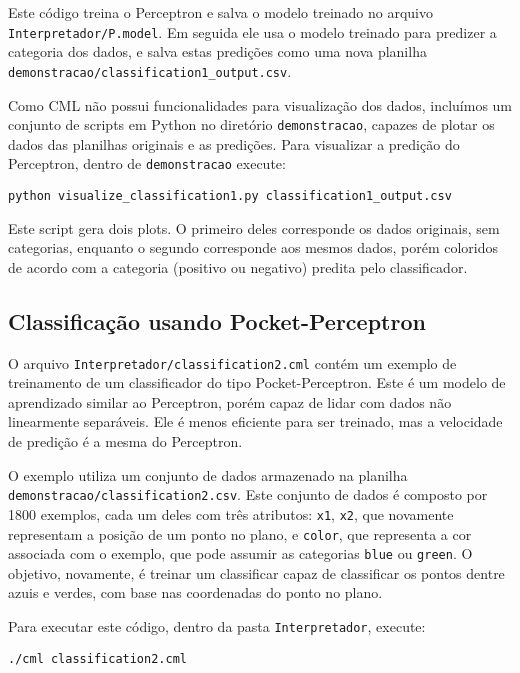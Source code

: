 \documentclass[12pt]{article}
\begin{document}
Este código treina o Perceptron e salva o modelo treinado no arquivo \texttt{Interpretador/P.model}. Em seguida ele usa o modelo treinado para predizer a categoria dos dados, e salva estas predições como uma nova planilha \texttt{demonstracao/classification1\_output.csv}.

Como CML não possui funcionalidades para visualização dos dados, incluímos um conjunto de scripts em Python no diretório \texttt{demonstracao}, capazes de plotar os dados das planilhas originais e as predições. Para visualizar a predição do Perceptron, dentro de \texttt{demonstracao} execute:

\begin{verbatim}
python visualize_classification1.py classification1_output.csv
\end{verbatim}

Este script gera dois plots. O primeiro deles corresponde os dados originais, sem categorias, enquanto o segundo corresponde aos mesmos dados, porém coloridos de acordo com a categoria (positivo ou negativo) predita pelo classificador.

\subsection{Classificação usando Pocket-Perceptron}

O arquivo \texttt{Interpretador/classification2.cml} contém um exemplo de treinamento de um classificador do tipo Pocket-Perceptron. Este é um modelo de aprendizado similar ao Perceptron, porém capaz de lidar com dados não linearmente separáveis. Ele é menos eficiente para ser treinado, mas a velocidade de predição é a mesma do Perceptron.

O exemplo utiliza um conjunto de dados armazenado na planilha \texttt{demonstracao/classification2.csv}. Este conjunto de dados é composto por 1800 exemplos, cada um deles com três atributos: \texttt{x1}, \texttt{x2}, que novamente representam a posição de um ponto no plano, e \texttt{color}, que representa a cor associada com o exemplo, que pode assumir as categorias \texttt{blue} ou \texttt{green}. O objetivo, novamente, é treinar um classificar capaz de classificar os pontos dentre azuis e verdes, com base nas coordenadas do ponto no plano. 

Para executar este código, dentro da pasta \texttt{Interpretador}, execute:

\begin{verbatim}
./cml classification2.cml
\end{verbatim}
\end{document}
